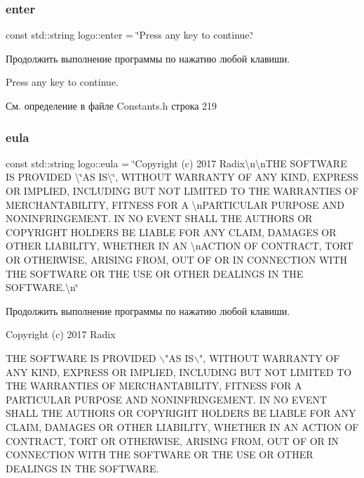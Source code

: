 \subsubsection{\texorpdfstring{enter}{enter}}
{\footnotesize\ttfamily const std\+::string logo\+::enter = \char`\"{}Press any key to continue.\char`\"{}}

Продолжить выполнение программы по нажатию любой клавиши. 
\begin{DoxyCode}
Press any key to \textcolor{keywordflow}{continue}.
\end{DoxyCode}
 

См. определение в файле Constants.\+h строка 219

\mbox{\label{namespacelogo_ae3d10c2b731b19f239a7311af363354c}} 
\subsubsection{\texorpdfstring{eula}{eula}}
{\footnotesize\ttfamily const std\+::string logo\+::eula = \char`\"{}Copyright (c) 2017 Radix\textbackslash{}n\textbackslash{}n\+T\+HE S\+O\+F\+T\+W\+A\+RE IS P\+R\+O\+V\+I\+D\+ED \textbackslash{}\char`\"{}AS I\+S\textbackslash{}\char`\"{}, W\+I\+T\+H\+O\+UT W\+A\+R\+R\+A\+N\+TY OF A\+NY K\+I\+ND, E\+X\+P\+R\+E\+SS OR I\+M\+P\+L\+I\+ED, I\+N\+C\+L\+U\+D\+I\+NG B\+UT N\+OT L\+I\+M\+I\+T\+ED TO T\+HE W\+A\+R\+R\+A\+N\+T\+I\+ES OF M\+E\+R\+C\+H\+A\+N\+T\+A\+B\+I\+L\+I\+TY, F\+I\+T\+N\+E\+SS F\+OR A \textbackslash{}n\+P\+A\+R\+T\+I\+C\+U\+L\+AR P\+U\+R\+P\+O\+SE A\+ND N\+O\+N\+I\+N\+F\+R\+I\+N\+G\+E\+M\+E\+N\+T. IN NO E\+V\+E\+NT S\+H\+A\+LL T\+HE A\+U\+T\+H\+O\+RS OR C\+O\+P\+Y\+R\+I\+G\+HT H\+O\+L\+D\+E\+RS BE L\+I\+A\+B\+LE F\+OR A\+NY C\+L\+A\+IM, D\+A\+M\+A\+G\+ES OR O\+T\+H\+ER L\+I\+A\+B\+I\+L\+I\+TY, W\+H\+E\+T\+H\+ER IN AN \textbackslash{}n\+A\+C\+T\+I\+ON OF C\+O\+N\+T\+R\+A\+CT, T\+O\+RT OR O\+T\+H\+E\+R\+W\+I\+SE, A\+R\+I\+S\+I\+NG F\+R\+OM, O\+UT OF OR IN C\+O\+N\+N\+E\+C\+T\+I\+ON W\+I\+TH T\+HE S\+O\+F\+T\+W\+A\+RE OR T\+HE U\+SE OR O\+T\+H\+ER D\+E\+A\+L\+I\+N\+GS IN T\+HE S\+O\+F\+T\+W\+A\+R\+E.\textbackslash{}n\char`\"{}}

Продолжить выполнение программы по нажатию любой клавиши. 
\begin{DoxyCode}
Copyright (c) 2017 Radix

THE SOFTWARE IS PROVIDED \(\backslash\)\textcolor{stringliteral}{"AS IS\(\backslash\)", WITHOUT WARRANTY OF ANY KIND, EXPRESS OR IMPLIED, INCLUDING BUT NOT
       LIMITED TO THE WARRANTIES OF MERCHANTABILITY, FITNESS FOR A }
\textcolor{stringliteral}{PARTICULAR PURPOSE AND NONINFRINGEMENT. IN NO EVENT SHALL THE AUTHORS OR COPYRIGHT HOLDERS BE LIABLE FOR
       ANY CLAIM, DAMAGES OR OTHER LIABILITY, WHETHER IN AN }
\textcolor{stringliteral}{ACTION OF CONTRACT, TORT OR OTHERWISE, ARISING FROM, OUT OF OR IN CONNECTION WITH THE SOFTWARE OR THE USE
       OR OTHER DEALINGS IN THE SOFTWARE.}
\end{DoxyCode}
 

